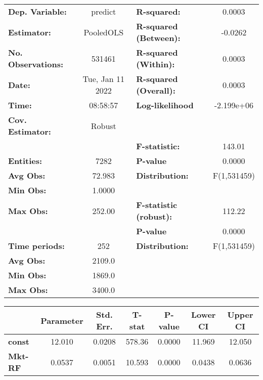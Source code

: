 \begin{center}
\begin{tabular}{lclc}
\toprule
\textbf{Dep. Variable:}    &      predict       & \textbf{  R-squared:         }   &      0.0003      \\
\textbf{Estimator:}        &     PooledOLS      & \textbf{  R-squared (Between):}  &     -0.0262      \\
\textbf{No. Observations:} &       531461       & \textbf{  R-squared (Within):}   &      0.0003      \\
\textbf{Date:}             &  Tue, Jan 11 2022  & \textbf{  R-squared (Overall):}  &      0.0003      \\
\textbf{Time:}             &      08:58:57      & \textbf{  Log-likelihood     }   &    -2.199e+06    \\
\textbf{Cov. Estimator:}   &       Robust       & \textbf{                     }   &                  \\
\textbf{}                  &                    & \textbf{  F-statistic:       }   &      143.01      \\
\textbf{Entities:}         &        7282        & \textbf{  P-value            }   &      0.0000      \\
\textbf{Avg Obs:}          &       72.983       & \textbf{  Distribution:      }   &   F(1,531459)    \\
\textbf{Min Obs:}          &       1.0000       & \textbf{                     }   &                  \\
\textbf{Max Obs:}          &       252.00       & \textbf{  F-statistic (robust):} &      112.22      \\
\textbf{}                  &                    & \textbf{  P-value            }   &      0.0000      \\
\textbf{Time periods:}     &        252         & \textbf{  Distribution:      }   &   F(1,531459)    \\
\textbf{Avg Obs:}          &       2109.0       & \textbf{                     }   &                  \\
\textbf{Min Obs:}          &       1869.0       & \textbf{                     }   &                  \\
\textbf{Max Obs:}          &       3400.0       & \textbf{                     }   &                  \\
\bottomrule
\end{tabular}
\begin{tabular}{lcccccc}
                & \textbf{Parameter} & \textbf{Std. Err.} & \textbf{T-stat} & \textbf{P-value} & \textbf{Lower CI} & \textbf{Upper CI}  \\
\midrule
\textbf{const}  &       12.010       &       0.0208       &      578.36     &      0.0000      &       11.969      &       12.050       \\
\textbf{Mkt-RF} &       0.0537       &       0.0051       &      10.593     &      0.0000      &       0.0438      &       0.0636       \\
\bottomrule
\end{tabular}
\end{center}
